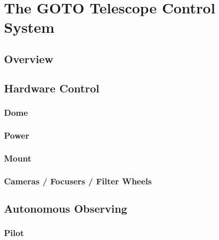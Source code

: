 \chapter{The GOTO Telescope Control System}
\label{chap:gtecs}
\chaptoc{}

\newpage
\section{Overview}
\label{sec:gtecs}

\lipsum{}

\newpage
\section{Hardware Control}
\label{sec:daemons}

\lipsum{}

\subsection{Dome}
\label{sec:daemons-dome}

\lipsum{}

\subsection{Power}
\label{sec:daemons-power}

\lipsum{}

\subsection{Mount}
\label{sec:daemons-mount}

\lipsum{}

\subsection{Cameras / Focusers / Filter Wheels}
\label{sec:daemons-fli}

\lipsum{}


\newpage
\section{Autonomous Observing}
\label{sec:autonomous}

\lipsum{}

\subsection{Pilot}
\label{sec:autonomous-pilot}

